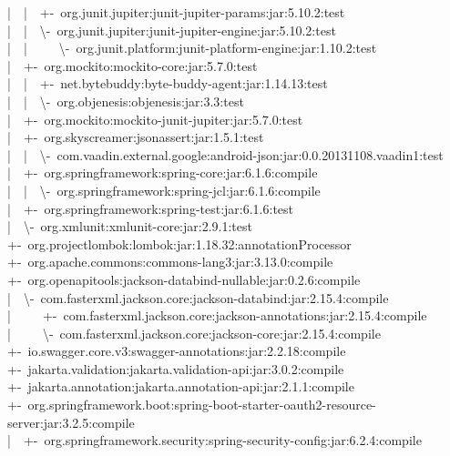 \documentclass[
    paper=a4,
    twoside=false,
    parskip=half,
    listof=entryprefix,
    listof=totoc,
    index=totoc,
    bibliography=totoc,
    headsepline,
]{scrbook}
\begin{document}
    |~~|~~+-~org.junit.jupiter:junit-jupiter-params:jar:5.10.2:test\\
    |~~|~~\textbackslash-~org.junit.jupiter:junit-jupiter-engine:jar:5.10.2:test\\
    |~~|~~~~~\textbackslash-~org.junit.platform:junit-platform-engine:jar:1.10.2:test\\
    |~~+-~org.mockito:mockito-core:jar:5.7.0:test\\
    |~~|~~+-~net.bytebuddy:byte-buddy-agent:jar:1.14.13:test\\
    |~~|~~\textbackslash-~org.objenesis:objenesis:jar:3.3:test\\
    |~~+-~org.mockito:mockito-junit-jupiter:jar:5.7.0:test\\
    |~~+-~org.skyscreamer:jsonassert:jar:1.5.1:test\\
    |~~|~~\textbackslash-~com.vaadin.external.google:android-json:jar:0.0.20131108.vaadin1:test\\
    |~~+-~org.springframework:spring-core:jar:6.1.6:compile\\
    |~~|~~\textbackslash-~org.springframework:spring-jcl:jar:6.1.6:compile\\
    |~~+-~org.springframework:spring-test:jar:6.1.6:test\\
    |~~\textbackslash-~org.xmlunit:xmlunit-core:jar:2.9.1:test\\
    +-~org.projectlombok:lombok:jar:1.18.32:annotationProcessor\\
    +-~org.apache.commons:commons-lang3:jar:3.13.0:compile\\
    +-~org.openapitools:jackson-databind-nullable:jar:0.2.6:compile\\
    |~~\textbackslash-~com.fasterxml.jackson.core:jackson-databind:jar:2.15.4:compile\\
    |~~~~~+-~com.fasterxml.jackson.core:jackson-annotations:jar:2.15.4:compile\\
    |~~~~~\textbackslash-~com.fasterxml.jackson.core:jackson-core:jar:2.15.4:compile\\
    +-~io.swagger.core.v3:swagger-annotations:jar:2.2.18:compile\\
    +-~jakarta.validation:jakarta.validation-api:jar:3.0.2:compile\\
    +-~jakarta.annotation:jakarta.annotation-api:jar:2.1.1:compile\\
    +-~org.springframework.boot:spring-boot-starter-oauth2-resource-server:jar:3.2.5:compile\\
    |~~+-~org.springframework.security:spring-security-config:jar:6.2.4:compile\\
\end{document}
